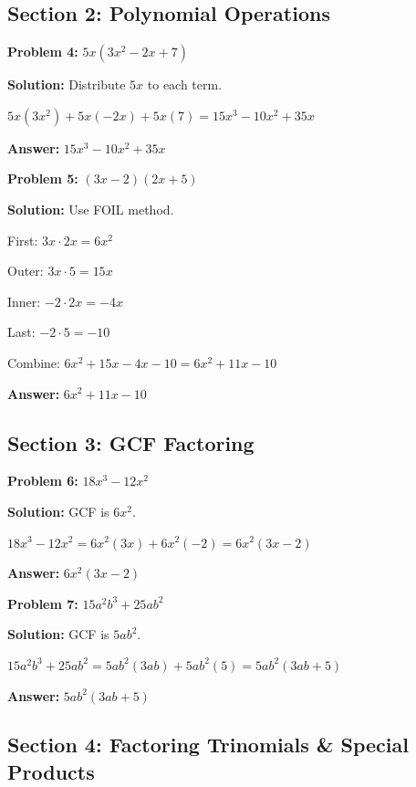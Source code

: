 \documentclass[12pt]{article}
\begin{document}
	\newpage

	\subsection*{Section 2: Polynomial Operations}

		\textbf{Problem 4:} $5x(3x^2 - 2x + 7)$
		
		\textbf{Solution:} Distribute $5x$ to each term.
		
		$5x(3x^2) + 5x(-2x) + 5x(7) = 15x^3 - 10x^2 + 35x$
		
		\textbf{Answer:} $15x^3 - 10x^2 + 35x$

		\vspace{0.5cm}

		\textbf{Problem 5:} $(3x - 2)(2x + 5)$
		
		\textbf{Solution:} Use FOIL method.
		
		First: $3x \cdot 2x = 6x^2$
		
		Outer: $3x \cdot 5 = 15x$
		
		Inner: $-2 \cdot 2x = -4x$
		
		Last: $-2 \cdot 5 = -10$
		
		Combine: $6x^2 + 15x - 4x - 10 = 6x^2 + 11x - 10$
		
		\textbf{Answer:} $6x^2 + 11x - 10$

	\newpage

	\subsection*{Section 3: GCF Factoring}

		\textbf{Problem 6:} $18x^3 - 12x^2$
		
		\textbf{Solution:} GCF is $6x^2$.
		
		$18x^3 - 12x^2 = 6x^2(3x) + 6x^2(-2) = 6x^2(3x - 2)$
		
		\textbf{Answer:} $6x^2(3x - 2)$

		\vspace{0.5cm}

		\textbf{Problem 7:} $15a^2b^3 + 25ab^2$
		
		\textbf{Solution:} GCF is $5ab^2$.
		
		$15a^2b^3 + 25ab^2 = 5ab^2(3ab) + 5ab^2(5) = 5ab^2(3ab + 5)$
		
		\textbf{Answer:} $5ab^2(3ab + 5)$

	\newpage

	\subsection*{Section 4: Factoring Trinomials \& Special Products}
\end{document}
